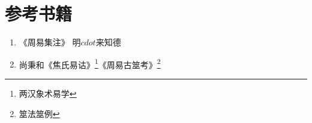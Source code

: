 \chapter{参考书籍}
\begin{enumerate}
  \item 《周易集注》 明$cdot$来知德
  \item 尚秉和《焦氏易诂》\footnote{两汉象术易学}《周易古筮考》\footnote{筮法筮例}  
\end{enumerate}
